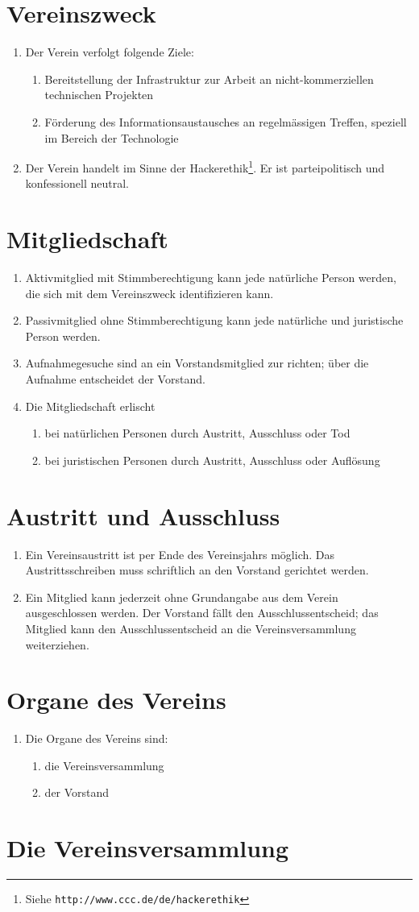 \documentclass[10pt,a4paper,parskip,fleqn]{scrartcl}
\newcommand{\ol}{\begin{enumerate}[itemsep=-0.2em,topsep=-0.2em]}
\newcommand{\lo}{\end{enumerate}}
\newcommand{\li}{\item}
\begin{document}
\section{Vereinszweck}

\ol
	\li Der Verein verfolgt folgende Ziele:
    \ol
      \li Bereitstellung der Infrastruktur zur Arbeit an nicht-kommerziellen
			technischen Projekten
      \li Förderung des Informationsaustausches an regelmässigen Treffen,
			speziell im Bereich der Technologie
    \lo
		\li Der Verein handelt im Sinne der
		Hackerethik\footnote{Siehe \texttt{http://www.ccc.de/de/hackerethik}}. Er
		ist parteipolitisch und konfessionell neutral.
\lo


\section{Mitgliedschaft}

\ol
  \li Aktivmitglied mit Stimmberechtigung kann jede natürliche Person werden,
	die sich mit dem Vereinszweck identifizieren kann.
	\li Passivmitglied ohne Stimmberechtigung kann jede natürliche und juristische
	Person werden.
	\li Aufnahmegesuche sind an ein Vorstandsmitglied zur richten; über die
	Aufnahme entscheidet der Vorstand.
	\li Die Mitgliedschaft erlischt
		\ol
			\li bei natürlichen Personen durch Austritt, Ausschluss oder Tod
			\li bei juristischen Personen durch Austritt, Ausschluss oder Auflösung
		\lo
\lo


\section{Austritt und Ausschluss}

\ol
	\li Ein Vereinsaustritt ist per Ende des Vereinsjahrs möglich. Das
	Austrittsschreiben muss schriftlich an den Vorstand gerichtet werden.
	\li Ein Mitglied kann jederzeit ohne Grundangabe aus dem Verein ausgeschlossen
	werden. Der Vorstand fällt den Ausschlussentscheid; das Mitglied kann den
	Ausschlussentscheid an die Vereinsversammlung weiterziehen.
\lo


\section{Organe des Vereins}

\ol
	\li Die Organe des Vereins sind:
		\ol
			\li die Vereinsversammlung
			\li der Vorstand
		\lo
\lo


\section{Die Vereinsversammlung}
\end{document}
